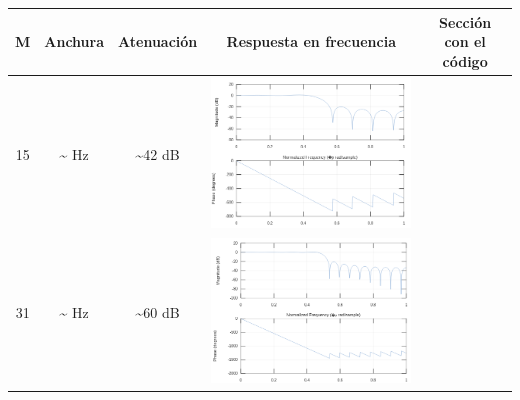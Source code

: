 \documentclass[11pt,a4paper]{article}
\begin{document}
\begin{table}[H]
\begin{tabular}{|c|c|c|c|c|}
\hline
M  & Anchura & Atenuación & Respuesta en frecuencia & Sección con el código \\ \hline
15 & \textasciitilde{} Hz            & \textasciitilde{}42 dB                       & \includegraphics[scale=0.3]{img/3.png} &  \color{deepred}\nameref{code2}\color{black} \\ \hline
31 & \textasciitilde{} Hz            & \textasciitilde{}60 dB                       & \includegraphics[scale=0.3]{img/4.png} & \color{deepred}\nameref{code3}\color{black} \\ \hline

\end{tabular}
\end{table}
\end{document}
